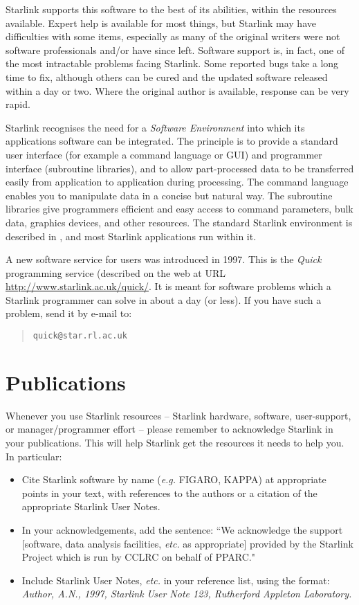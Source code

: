 \documentclass[twoside,11pt,nolof]{starlink}
\begin{document}
Starlink supports this software to the best of its abilities, within the
resources available.
Expert help is available for most things, but Starlink may have difficulties
with some items, especially as many of the original writers were not software
professionals and/or have since left.
Software support is, in fact, one of the most intractable problems facing
Starlink.
Some reported bugs take a long time to fix, although others can be cured
and the updated software released within a day or two.
Where the original author is available, response can be very rapid.

Starlink recognises the need for a \emph{Software Environment}\/ into which its
applications software can be integrated.
The principle is to provide a standard user interface (for example a command
language or GUI) and programmer interface (subroutine libraries), and to allow
part-processed data to be transferred easily from application to application
during processing.
The command language enables you to manipulate data in a concise but natural
way.
The subroutine libraries give programmers efficient and easy access to
command parameters, bulk data, graphics devices, and other resources.
The standard Starlink environment is described in
,
and most Starlink applications run within it.

A new software service for users was introduced in 1997.
This is the \emph{Quick}\/ programming service (described on the web at URL
\url{http://www.starlink.ac.uk/quick/}.
It is meant for software problems which a Starlink programmer can solve in
about a day (or less).
If you have such a problem, send it by e-mail to:
\begin{quote}
\texttt{quick@star.rl.ac.uk}
\end{quote}

\newpage

\section{Publications}

Whenever you use Starlink resources -- Starlink hardware, software,
user-support, or manager/programmer effort -- please remember to acknowledge
Starlink in your publications.
This will help Starlink get the resources it needs to help you.
In particular:
\begin{itemize}
\item Cite Starlink software by name (\emph{e.g.}\/ FIGARO, KAPPA) at
appropriate points in your text, with references to the authors or a citation
of the appropriate Starlink User Notes.
\item In your acknowledgements, add the sentence: ``We acknowledge the support
[software, data analysis facilities, \emph{etc.}\/ as appropriate] provided
by the Starlink Project which is run by CCLRC on behalf of PPARC."
\item Include Starlink User Notes, \emph{etc.}\/ in your reference list, using
the format:\\
\emph{Author, A.N., 1997, Starlink User Note 123, Rutherford Appleton
Laboratory.}
\end{itemize}
\end{document}
